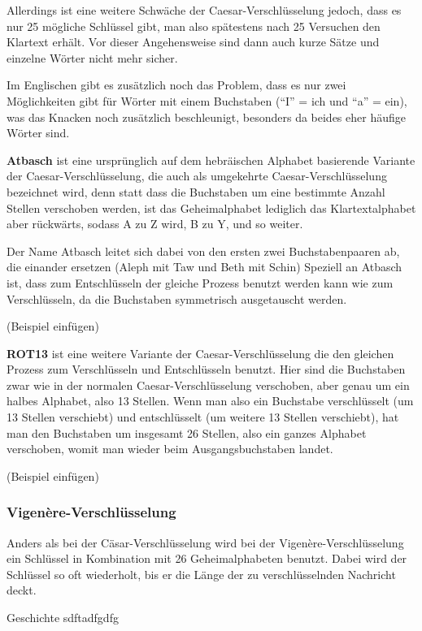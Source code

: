 Allerdings ist eine weitere Schwäche der Caesar-Verschlüsselung jedoch, dass es nur 25 mögliche Schlüssel gibt, man also spätestens nach 25 Versuchen den Klartext erhält. Vor dieser Angehensweise sind dann auch kurze Sätze und einzelne Wörter nicht mehr sicher.

Im Englischen gibt es zusätzlich noch das Problem, dass es nur zwei Möglichkeiten gibt für Wörter mit einem Buchstaben (\enquote{I} = ich und \enquote{a} = ein), was das Knacken noch zusätzlich beschleunigt, besonders da beides eher häufige Wörter sind.

\textbf{Atbasch} ist eine ursprünglich auf dem hebräischen Alphabet basierende Variante der Caesar-Verschlüsselung, die auch als umgekehrte Caesar-Verschlüsselung bezeichnet wird, denn statt dass die Buchstaben um eine bestimmte Anzahl Stellen verschoben werden, ist das Geheimalphabet lediglich das Klartextalphabet aber rückwärts, sodass A zu Z wird, B zu Y, und so weiter.

Der Name Atbasch leitet sich dabei von den ersten zwei Buchstabenpaaren ab, die einander ersetzen (Aleph mit Taw und Beth mit Schin)
Speziell an Atbasch ist, dass zum Entschlüsseln der gleiche Prozess benutzt werden kann wie zum Verschlüsseln, da die Buchstaben symmetrisch ausgetauscht werden.

(Beispiel einfügen)

\textbf{ROT13} ist eine weitere Variante der Caesar-Verschlüsselung die den gleichen Prozess zum Verschlüsseln und Entschlüsseln benutzt. Hier sind die Buchstaben zwar wie in der normalen Caesar-Verschlüsselung verschoben, aber genau um ein halbes Alphabet, also 13 Stellen. Wenn man also ein Buchstabe verschlüsselt (um 13 Stellen verschiebt) und entschlüsselt (um weitere 13 Stellen verschiebt), hat man den Buchstaben um insgesamt 26 Stellen, also ein ganzes Alphabet verschoben, womit man wieder beim Ausgangsbuchstaben landet.

(Beispiel einfügen)

\newpage				
\subsubsection{Vigenère-Verschlüsselung}
Anders als bei der Cäsar-Verschlüsselung wird bei der Vigenère-Verschlüsselung ein Schlüssel in Kombination mit 26 Geheimalphabeten benutzt. Dabei wird der Schlüssel so oft wiederholt, bis er die Länge der zu verschlüsselnden Nachricht deckt.

Geschichte
sdftadfgdfg

